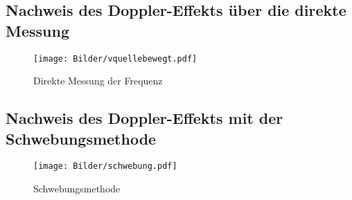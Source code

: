 \subsection{Nachweis des Doppler-Effekts über die direkte Messung}

\begin{figure}
	\texttt{[image: Bilder/vquellebewegt.pdf]}
	\caption{Direkte Messung der Frequenz}
	\label{fig:doppler}
\end{figure}
\FloatBarrier
\subsection{Nachweis des Doppler-Effekts mit der Schwebungsmethode}
\begin{figure}
	\texttt{[image: Bilder/schwebung.pdf]}
	\caption{Schwebungsmethode}
	\label{fig:doppler_schwebung}
\end{figure}
